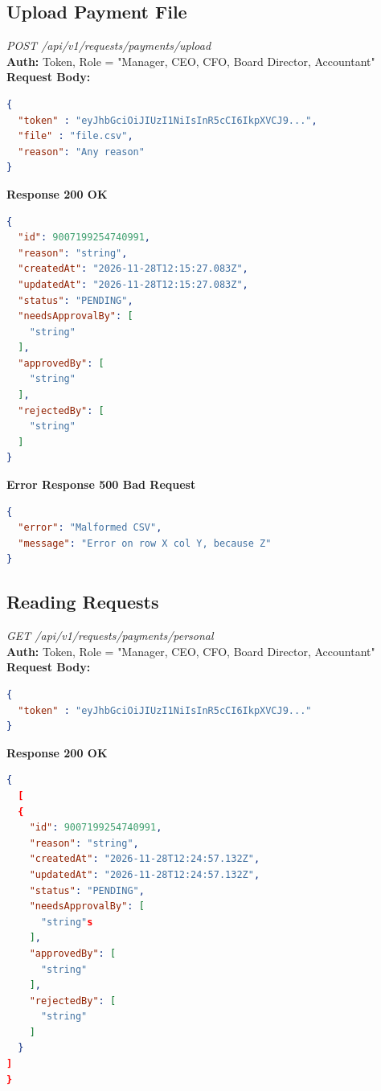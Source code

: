 \documentclass[11pt,a4paper]{article}
\begin{document}
\subsection{Upload Payment File}

\emph{POST /api/v1/requests/payments/upload} \\
\textbf{Auth:} Token, Role = "Manager, CEO, CFO, Board Director, Accountant" \\
\textbf{Request Body:} \\
\begin{lstlisting}[language=json]
{
  "token" : "eyJhbGciOiJIUzI1NiIsInR5cCI6IkpXVCJ9...",
  "file" : "file.csv",
  "reason": "Any reason"
}
\end{lstlisting}
\textbf{Response 200 OK}

\begin{lstlisting}[language=json]
{
  "id": 9007199254740991,
  "reason": "string",
  "createdAt": "2026-11-28T12:15:27.083Z",
  "updatedAt": "2026-11-28T12:15:27.083Z",
  "status": "PENDING",
  "needsApprovalBy": [
    "string"
  ],
  "approvedBy": [
    "string"
  ],
  "rejectedBy": [
    "string"
  ]
}
\end{lstlisting}

\textbf{Error Response 500 Bad Request}
\begin{lstlisting}[language=json]
{
  "error": "Malformed CSV", 
  "message": "Error on row X col Y, because Z"
}
\end{lstlisting}


\subsection{Reading Requests}

\emph{GET /api/v1/requests/payments/personal} \\
\textbf{Auth:} Token, Role = "Manager, CEO, CFO, Board Director, Accountant" \\
\textbf{Request Body:} \\
\begin{lstlisting}[language=json]
{
  "token" : "eyJhbGciOiJIUzI1NiIsInR5cCI6IkpXVCJ9..."
}
\end{lstlisting}
\textbf{Response 200 OK}

\begin{lstlisting}[language=json]
{
  [
  {
    "id": 9007199254740991,
    "reason": "string",
    "createdAt": "2026-11-28T12:24:57.132Z",
    "updatedAt": "2026-11-28T12:24:57.132Z",
    "status": "PENDING",
    "needsApprovalBy": [
      "string"s
    ],
    "approvedBy": [
      "string"
    ],
    "rejectedBy": [
      "string"
    ]
  }
]
}
\end{lstlisting}
\end{document}
